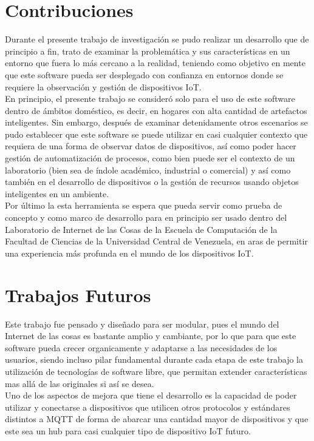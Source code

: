 \section{Contribuciones}
Durante el presente trabajo de investigación se pudo realizar un desarrollo que de principio a fin, trato de examinar la problemática y sus características en un entorno que fuera lo más cercano a la realidad, teniendo como objetivo en mente que este software pueda ser desplegado con confianza en entornos donde se requiere la observación y gestión de dispositivos IoT.\\

En principio, el presente trabajo se consideró solo para el uso de este software dentro de ámbitos doméstico, es decir, en hogares con alta cantidad de artefactos inteligentes. Sin embargo, después de examinar detenidamente otros escenarios se pudo establecer que este software se puede utilizar en casi cualquier contexto que requiera de una forma de observar datos de dispositivos, así como poder hacer gestión de automatización de procesos, como bien puede ser el contexto de un laboratorio (bien sea de índole académico, industrial o comercial) y así como también en el desarrollo de dispositivos o la gestión de recursos usando objetos inteligentes en un ambiente.\\
 
Por último la esta herramienta se espera que pueda servir como prueba de concepto y como marco de desarrollo para en principio ser usado dentro del Laboratorio de Internet de las Cosas de la Escuela de Computación de la Facultad de Ciencias de la Universidad Central de Venezuela, en aras de permitir una experiencia más profunda en el mundo de los dispositivos IoT. 

\section{Trabajos Futuros}
Este trabajo fue pensado y diseñado para ser modular, pues el mundo del Internet de las cosas es bastante amplio y cambiante, por lo que para que este software pueda crecer organicamente y adaptarse a las necesidades de los usuarios, siendo incluso pilar fundamental durante cada etapa de este trabajo la utilización de tecnologías de software libre, que permitan extender características mas allá de las originales si así se desea.\\

Uno de los aspectos de mejora que tiene el desarrollo es la capacidad de poder utilizar y conectarse a dispositivos que utilicen otros protocolos y estándares distintos a MQTT de forma de abarcar una cantidad mayor de dispositivos y que este sea un hub para casi cualquier tipo de dispositivo IoT futuro.\\

